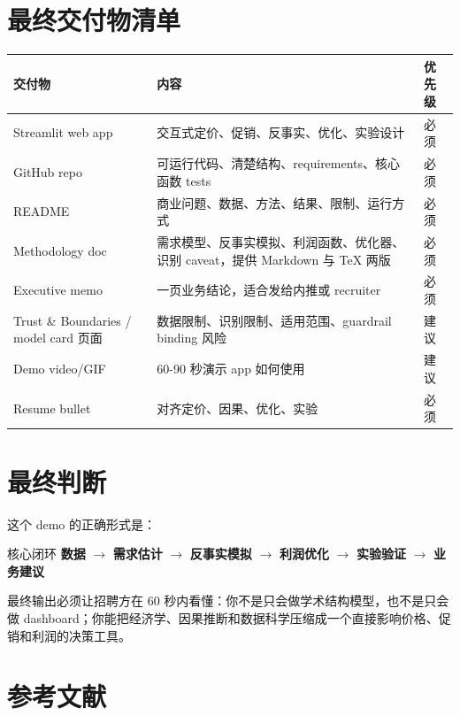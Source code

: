 \documentclass[UTF8,11pt,a4paper,fontset=none]{ctexart}
\begin{document}
\section{最终交付物清单}

\begin{tabularx}{\textwidth}{L{4.0cm}Y L{2.4cm}}
\toprule
交付物 & 内容 & 优先级 \\
\midrule
Streamlit web app & 交互式定价、促销、反事实、优化、实验设计 & 必须 \\
GitHub repo & 可运行代码、清楚结构、requirements、核心函数 tests & 必须 \\
README & 商业问题、数据、方法、结果、限制、运行方式 & 必须 \\
Methodology doc & 需求模型、反事实模拟、利润函数、优化器、识别 caveat，提供 Markdown 与 TeX 两版 & 必须 \\
Executive memo & 一页业务结论，适合发给内推或 recruiter & 必须 \\
Trust \& Boundaries / model card 页面 & 数据限制、识别限制、适用范围、guardrail binding 风险 & 建议 \\
Demo video/GIF & 60-90 秒演示 app 如何使用 & 建议 \\
Resume bullet & 对齐定价、因果、优化、实验 & 必须 \\
\bottomrule
\end{tabularx}

\section{最终判断}

这个 demo 的正确形式是：

\begin{decisionbox}{核心闭环}
\centering
\textbf{数据} $\rightarrow$ \textbf{需求估计} $\rightarrow$ \textbf{反事实模拟} $\rightarrow$ \textbf{利润优化} $\rightarrow$ \textbf{实验验证} $\rightarrow$ \textbf{业务建议}
\end{decisionbox}

最终输出必须让招聘方在 60 秒内看懂：你不是只会做学术结构模型，也不是只会做 dashboard；你能把经济学、因果推断和数据科学压缩成一个直接影响价格、促销和利润的决策工具。

\section*{参考文献}
\end{document}
